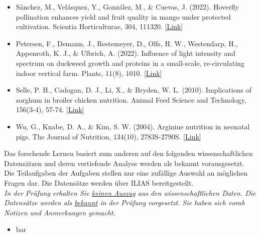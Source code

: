 \documentclass[a4paper, 9pt]{scrartcl}\usepackage[]{graphicx}\usepackage[]{xcolor}
\begin{document}
\begin{itemize}[noitemsep]
\item Sánchez, M., Velásquez, Y., González, M., \& Cuevas, J. (2022). Hoverfly pollination enhances yield and fruit quality in mango under protected cultivation. Scientia Horticulturae, 304, 111320. [\href{https://www.sciencedirect.com/science/article/pii/S0304423822004411}{Link}]
\item Petersen, F., Demann, J., Restemeyer, D., Olfs, H. W., Westendarp, H., Appenroth, K. J., \& Ulbrich, A. (2022). Influence of light intensity and spectrum on duckweed growth and proteins in a small-scale, re-circulating indoor vertical farm. Plants, 11(8), 1010. [\href{https://www.mdpi.com/2223-7747/11/8/1010}{Link}]
\item Selle, P. H., Cadogan, D. J., Li, X., \& Bryden, W. L. (2010). Implications of sorghum in broiler chicken nutrition. Animal Feed Science and Technology, 156(3-4), 57-74. [\href{https://www.sciencedirect.com/science/article/pii/S0377840110000209}{Link}]
\item Wu, G., Knabe, D. A., \& Kim, S. W. (2004). Arginine nutrition in neonatal pigs. The Journal of Nutrition, 134(10), 2783S-2790S. [\href{https://www.sciencedirect.com/science/article/pii/S0022316623031279}{Link}]
\end{itemize}

Das forschende Lernen basiert zum anderen auf den folgenden wissenschaftlichen Datensätzen und deren vertiefende Analyse werden als bekannt vorausgesetzt. Die Teilaufgaben der Aufgaben stellen nur eine zufällige Auswahl an möglichen Fragen dar. Die Datensätze werden über ILIAS bereitgestellt.\\

\textit{In der Prüfung erhalten Sie \underline{keinen Auszug} aus den wissenschaftlichen Daten. Die Datensätze werden als \underline{bekannt} in der Prüfung vorgesetzt. Sie haben sich vorab Notizen und Anmerkungen gemacht.}

\begin{itemize}[noitemsep]
\item bar
\end{itemize}

\clearpage
\end{document}
